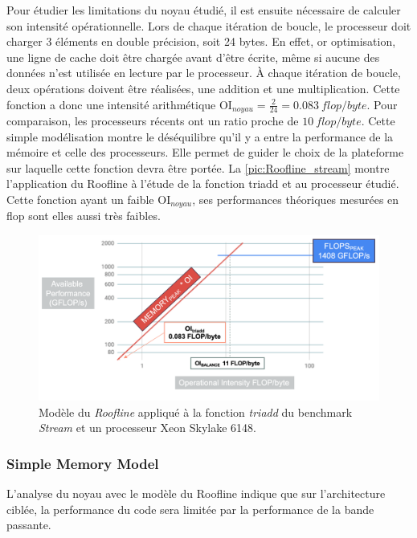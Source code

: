         Pour étudier les limitations du noyau étudié, il est ensuite nécessaire de calculer son intensité opérationnelle. Lors de chaque itération de boucle, le processeur doit charger 3 éléments en double précision, soit 24 bytes. En effet, or optimisation, une ligne de cache doit être chargée avant d'être écrite, même si aucune des données n'est utilisée en lecture par le processeur. À chaque itération de boucle, deux opérations doivent être réalisées, une addition et une multiplication. Cette fonction a donc une intensité arithmétique $\text{OI}_{noyau} = \frac{2}{24} = 0.083\ flop/byte$.
        Pour comparaison, les processeurs récents ont un ratio proche de $10\ flop/byte$. Cette simple modélisation montre le déséquilibre qu'il y a entre la performance de la mémoire et celle des processeurs. Elle permet de guider le choix de la plateforme sur laquelle cette fonction devra être portée. La \autoref{pic:Roofline_stream} montre l'application du Roofline à l'étude de la fonction triadd et au processeur étudié. Cette fonction ayant un faible $\text{OI}_{noyau}$, ses performances théoriques mesurées en flop sont elles aussi très faibles.
        
        \begin{figure}
            \center
            \includegraphics[width=14cm]{images/roofline_stream.png}
            \caption{\label{pic:Roofline_stream} Modèle du \textit{Roofline} appliqué à la fonction \textit{triadd} du benchmark \textit{Stream} et un processeur Xeon Skylake 6148.}
        \end{figure}
    


\subsubsection{Simple Memory Model} 
    L'analyse du noyau avec le modèle du Roofline indique que sur l'architecture ciblée, la performance du code sera limitée par la performance de la bande passante.


